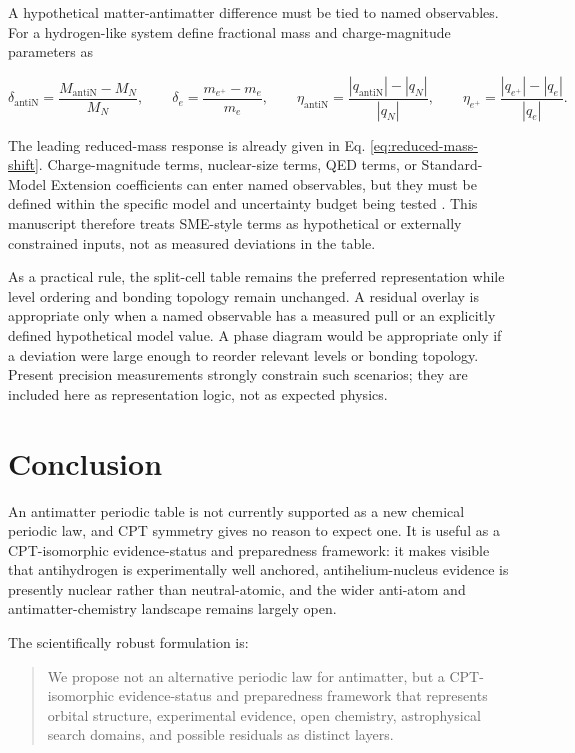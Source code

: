 \documentclass[11pt,a4paper]{article}
\begin{document}
A hypothetical matter-antimatter difference must be tied to named observables. For a hydrogen-like system define fractional mass and charge-magnitude parameters as

\begin{equation}
\delta_{\mathrm{antiN}}=\frac{M_{\mathrm{antiN}}-M_N}{M_N},
\qquad
\delta_e=\frac{m_{e^+}-m_e}{m_e},
\qquad
\eta_{\mathrm{antiN}}=\frac{|q_{\mathrm{antiN}}|-|q_N|}{|q_N|},
\qquad
\eta_{e^+}=\frac{|q_{e^+}|-|q_e|}{|q_e|}.
\end{equation}

The leading reduced-mass response is already given in Eq. \eqref{eq:reduced-mass-shift}. Charge-magnitude terms, nuclear-size terms, QED terms, or Standard-Model Extension coefficients can enter named observables, but they must be defined within the specific model and uncertainty budget being tested \cite{Bluhm1999,KosteleckyVargas2015}. This manuscript therefore treats SME-style terms as hypothetical or externally constrained inputs, not as measured deviations in the table.

As a practical rule, the split-cell table remains the preferred representation while level ordering and bonding topology remain unchanged. A residual overlay is appropriate only when a named observable has a measured pull or an explicitly defined hypothetical model value. A phase diagram would be appropriate only if a deviation were large enough to reorder relevant levels or bonding topology. Present precision measurements strongly constrain such scenarios; they are included here as representation logic, not as expected physics.

\newpage
\section{Conclusion}

An antimatter periodic table is not currently supported as a new chemical periodic law, and CPT symmetry gives no reason to expect one. It is useful as a CPT-isomorphic evidence-status and preparedness framework: it makes visible that antihydrogen is experimentally well anchored, antihelium-nucleus evidence is presently nuclear rather than neutral-atomic, and the wider anti-atom and antimatter-chemistry landscape remains largely open.

The scientifically robust formulation is:

\begin{quote}
We propose not an alternative periodic law for antimatter, but a CPT-isomorphic evidence-status and preparedness framework that represents orbital structure, experimental evidence, open chemistry, astrophysical search domains, and possible residuals as distinct layers.
\end{quote}
\end{document}
